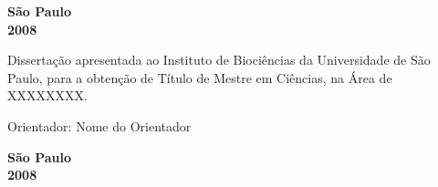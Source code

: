 \begin{titlepage}
\oddsidemargin 1.2cm
\evensidemargin 0cm
\begin{center}
{\LARGE \nomedoaluno}
\par
\vspace{200pt}
{\Huge \tit}
\par
\vspace{280pt}
\textbf{{\large São Paulo}\\
{\large 2008}}
\end{center}
\end{titlepage}
\clearpage{\pagestyle{empty}\cleardoublepage}

\oddsidemargin 1.2cm
\evensidemargin 0cm


\thispagestyle{empty}
\begin{center}
{\LARGE \nomedoaluno}
\par
\vspace{203pt}
{\Huge \tit}
\end{center}

\par
\vspace{90pt}
\hspace*{16em}\parbox{7.6cm}{{\large Dissertação apresentada ao Instituto de Biociências da Universidade de São Paulo, para a obtenção de Título de Mestre em Ciências, na Área de XXXXXXXX.}}

\par
\vspace{1em}
\hspace*{16em}\parbox{7.6cm}{{\large Orientador: Nome do Orientador}}

\par
\vspace{100pt}
\begin{center}
\textbf{{\large São Paulo}\\
{\large 2008}}
\end{center}

\newpage

\thispagestyle{empty}

